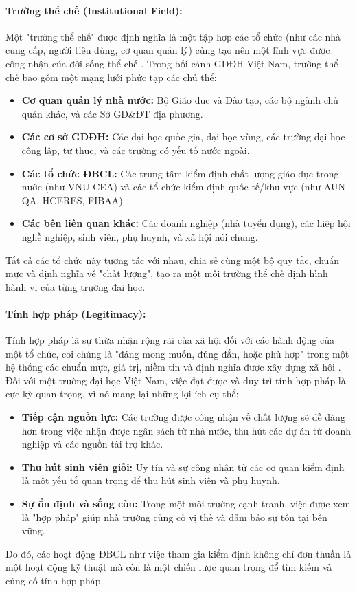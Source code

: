 \documentclass[12pt, a4paper, openany]{report}
\begin{document}
\paragraph{Trường thể chế (Institutional Field):}
Một "trường thể chế" được định nghĩa là một tập hợp các tổ chức (như các nhà cung cấp, người tiêu dùng, cơ quan quản lý) cùng tạo nên một lĩnh vực được công nhận của đời sống thể chế \cite{DiMaggioPowell1983}. Trong bối cảnh GDĐH Việt Nam, trường thể chế bao gồm một mạng lưới phức tạp các chủ thể:
\begin{itemize}
    \item \textbf{Cơ quan quản lý nhà nước:} Bộ Giáo dục và Đào tạo, các bộ ngành chủ quản khác, và các Sở GD\&ĐT địa phương.
    \item \textbf{Các cơ sở GDĐH:} Các đại học quốc gia, đại học vùng, các trường đại học công lập, tư thục, và các trường có yếu tố nước ngoài.
    \item \textbf{Các tổ chức ĐBCL:} Các trung tâm kiểm định chất lượng giáo dục trong nước (như VNU-CEA) và các tổ chức kiểm định quốc tế/khu vực (như AUN-QA, HCERES, FIBAA).
    \item \textbf{Các bên liên quan khác:} Các doanh nghiệp (nhà tuyển dụng), các hiệp hội nghề nghiệp, sinh viên, phụ huynh, và xã hội nói chung.
\end{itemize}
Tất cả các tổ chức này tương tác với nhau, chia sẻ cùng một bộ quy tắc, chuẩn mực và định nghĩa về "chất lượng", tạo ra một môi trường thể chế định hình hành vi của từng trường đại học.

\paragraph{Tính hợp pháp (Legitimacy):}
Tính hợp pháp là sự thừa nhận rộng rãi của xã hội đối với các hành động của một tổ chức, coi chúng là "đáng mong muốn, đúng đắn, hoặc phù hợp" trong một hệ thống các chuẩn mực, giá trị, niềm tin và định nghĩa được xây dựng xã hội \cite{Suchman1995}. Đối với một trường đại học Việt Nam, việc đạt được và duy trì tính hợp pháp là cực kỳ quan trọng, vì nó mang lại những lợi ích cụ thể:
\begin{itemize}
    \item \textbf{Tiếp cận nguồn lực:} Các trường được công nhận về chất lượng sẽ dễ dàng hơn trong việc nhận được ngân sách từ nhà nước, thu hút các dự án từ doanh nghiệp và các nguồn tài trợ khác.
    \item \textbf{Thu hút sinh viên giỏi:} Uy tín và sự công nhận từ các cơ quan kiểm định là một yếu tố quan trọng để thu hút sinh viên và phụ huynh.
    \item \textbf{Sự ổn định và sống còn:} Trong một môi trường cạnh tranh, việc được xem là "hợp pháp" giúp nhà trường củng cố vị thế và đảm bảo sự tồn tại bền vững.
\end{itemize}
Do đó, các hoạt động ĐBCL như việc tham gia kiểm định không chỉ đơn thuần là một hoạt động kỹ thuật mà còn là một chiến lược quan trọng để tìm kiếm và củng cố tính hợp pháp.
\end{document}

